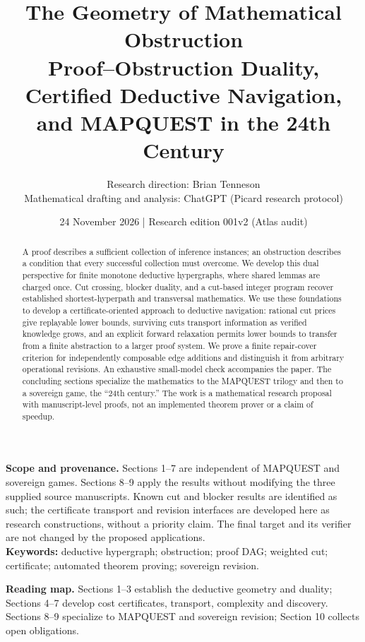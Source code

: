 \documentclass[11pt]{article}
\title{\textbf{The Geometry of Mathematical Obstruction}\\[4pt]\large Proof--Obstruction Duality, Certified Deductive Navigation,\\and MAPQUEST in the 24th Century}
\author{Research direction: Brian Tenneson\\Mathematical drafting and analysis: ChatGPT (Picard research protocol)}
\date{24 November 2026 \quad | \quad Research edition 001v2 (Atlas audit)}
\theoremstyle{remark}\newtheorem{remark}[theorem]{Remark}
\begin{document}
\maketitle
\begin{abstract}
A proof describes a sufficient collection of inference instances; an obstruction describes a condition that every successful collection must overcome. We develop this dual perspective for finite monotone deductive hypergraphs, where shared lemmas are charged once. Cut crossing, blocker duality, and a cut-based integer program recover established shortest-hyperpath and transversal mathematics. We use these foundations to develop a certificate-oriented approach to deductive navigation: rational cut prices give replayable lower bounds, surviving cuts transport information as verified knowledge grows, and an explicit forward relaxation permits lower bounds to transfer from a finite abstraction to a larger proof system. We prove a finite repair-cover criterion for independently composable edge additions and distinguish it from arbitrary operational revisions. An exhaustive small-model check accompanies the paper. The concluding sections specialize the mathematics to the MAPQUEST trilogy and then to a sovereign game, the ``24th century.'' The work is a mathematical research proposal with manuscript-level proofs, not an implemented theorem prover or a claim of speedup.
\end{abstract}
\noindent\textbf{Scope and provenance.} Sections 1--7 are independent of MAPQUEST and sovereign games. Sections 8--9 apply the results without modifying the three supplied source manuscripts. Known cut and blocker results are identified as such; the certificate transport and revision interfaces are developed here as research constructions, without a priority claim. The final target and its verifier are not changed by the proposed applications.\\
\noindent\textbf{Keywords:} deductive hypergraph; obstruction; proof DAG; weighted cut; certificate; automated theorem proving; sovereign revision.
\par\medskip\noindent\textbf{Reading map.} Sections 1--3 establish the deductive geometry and duality; Sections 4--7 develop cost certificates, transport, complexity and discovery. Sections 8--9 specialize to MAPQUEST and sovereign revision; Section 10 collects open obligations.
\newpage
\end{document}
